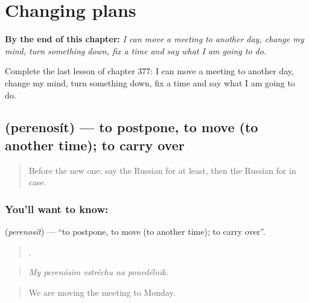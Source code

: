 
\chapter{Changing plans}
\label{ch:ru-changing-plans}

\begin{chapteropening}
\textbf{By the end of this chapter:} \emph{I can move a meeting to another day, change my mind, turn something down, fix a time and say what I am going to do.}

Complete the last lesson of chapter 377: I can move a meeting to another day, change my mind, turn something down, fix a time and say what I am going to do.
\end{chapteropening}

\section[\texorpdfstring{\ru{переносить} (perenosít)}{переносить (perenosít)}]{ (perenosít) — to postpone, to move (to another time); to carry over}

\label{lesson:RU-C377-perenosit}



\begin{quote}
Before the new one: say the Russian for at least, then the Russian for in case.
\end{quote}

\subsection*{You'll want to know: }
\textbf{} (\emph{perenosít}) — \textquotedblleft{}to postpone, to move (to another time); to carry over\textquotedblright{}.

\begin{quote}
    .
\end{quote}

\begin{quote}
\emph{My perenósim vstréchu na ponedélnik.}
\end{quote}

\begin{quote}
We are moving the meeting to Monday.
\end{quote}

